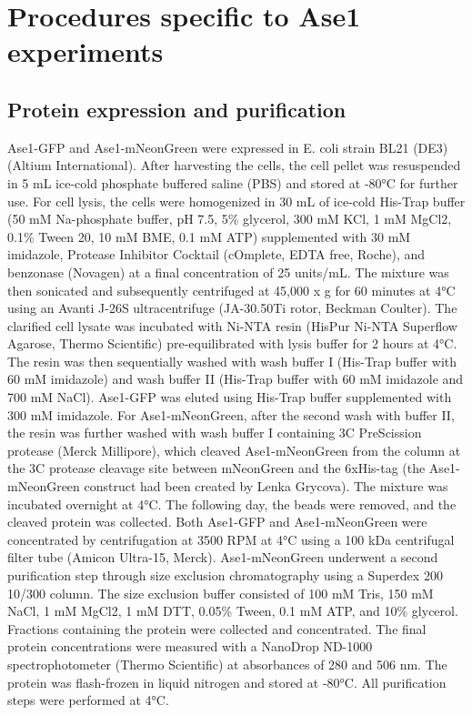 \section{Procedures specific to Ase1 experiments}
\subsection{Protein expression and purification}
Ase1-GFP \parencite{Janson2007} and Ase1-mNeonGreen were expressed in E. coli strain BL21 (DE3) (Altium International). After harvesting the cells, the cell pellet was resuspended in 5 mL ice-cold phosphate buffered saline (PBS) and stored at -80°C for further use. For cell lysis, the cells were homogenized in 30 mL of ice-cold His-Trap buffer (50 mM Na-phosphate buffer, pH 7.5, 5\% glycerol, 300 mM KCl, 1 mM MgCl2, 0.1\% Tween 20, 10 mM BME, 0.1 mM ATP) supplemented with 30 mM imidazole, Protease Inhibitor Cocktail (cOmplete, EDTA free, Roche), and benzonase (Novagen) at a final concentration of 25 units/mL. The mixture was then sonicated and subsequently centrifuged at 45,000 x g for 60 minutes at 4°C using an Avanti J-26S ultracentrifuge (JA-30.50Ti rotor, Beckman Coulter). The clarified cell lysate was incubated with Ni-NTA resin (HisPur Ni-NTA Superflow Agarose, Thermo Scientific) pre-equilibrated with lysis buffer for 2 hours at 4°C. The resin was then sequentially washed with wash buffer I (His-Trap buffer with 60 mM imidazole) and wash buffer II (His-Trap buffer with 60 mM imidazole and 700 mM NaCl). Ase1-GFP was eluted using His-Trap buffer supplemented with 300 mM imidazole. For Ase1-mNeonGreen, after the second wash with buffer II, the resin was further washed with wash buffer I containing 3C PreScission protease (Merck Millipore), which cleaved Ase1-mNeonGreen from the column at the 3C protease cleavage site between mNeonGreen and the 6xHis-tag (the Ase1-mNeonGreen construct had been created by Lenka Grycova). The mixture was incubated overnight at 4°C. The following day, the beads were removed, and the cleaved protein was collected. Both Ase1-GFP and Ase1-mNeonGreen were concentrated by centrifugation at 3500 RPM at 4°C using a 100 kDa centrifugal filter tube (Amicon Ultra-15, Merck). Ase1-mNeonGreen underwent a second purification step through size exclusion chromatography using a Superdex 200 10/300 column. The size exclusion buffer consisted of 100 mM Tris, 150 mM NaCl, 1 mM MgCl2, 1 mM DTT, 0.05\% Tween, 0.1 mM ATP, and 10\% glycerol. Fractions containing the protein were collected and concentrated. The final protein concentrations were measured with a NanoDrop ND-1000 spectrophotometer (Thermo Scientific) at absorbances of 280 and 506 nm. The protein was flash-frozen in liquid nitrogen and stored at -80°C. All purification steps were performed at 4°C.

